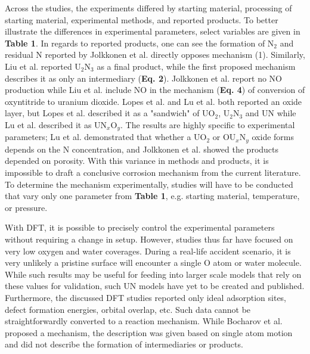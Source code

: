 \documentclass[11pt]{article}
\begin{document}
\begin{multicols}{2}
\par Across the studies, the experiments differed by starting material, processing of starting material, experimental methods, and reported products. To better illustrate the differences in experimental parameters, select variables are given in \textbf{Table 1}. In regards to reported products, one can see the formation of N$_{2}$ and residual N reported by Jolkkonen et al. \cite{Jolkkonen2017} directly opposes mechanism (1). Similarly, Liu et al. \cite{Liu2013} reported U$_{2}$N$_{3}$ as a final product, while the first proposed mechanism describes it as only an intermediary (\textbf{Eq. 2}). Jolkkonen et al. report no NO production while Liu et al. include NO in the mechanism (\textbf{Eq. 4}) of conversion of oxyntitride to uranium dioxide. Lopes et al. and Lu et al. both reported an oxide layer, but Lopes et al. described it as a "sandwich" of UO$_{2}$, U$_{2}$N$_{3}$ and UN while Lu et al. described it as UN$_{x}$O$_{y}$.
 The results are highly specific to experimental parameters; Lu et al. demonstrated that whether a UO$_{2}$ or  OU$_{x}$N$_{y}$ oxide forms depends on the N concentration, and Jolkkonen et al. showed the products depended on porosity. With this variance in methods and products, it is impossible to draft a conclusive corrosion mechanism from the current literature. To determine the mechanism experimentally, studies will have to be conducted that vary only one parameter from \textbf{Table 1}, e.g. starting material, temperature, or pressure.

\par With DFT, it is possible to precisely control the experimental parameters without requiring a change in setup. However, studies thus far have focused on very low oxygen and water coverages. During a real-life accident scenario, it is very unlikely a pristine surface will encounter a single O atom or water molecule. While such results may be useful for feeding into larger scale models that rely on these values for validation, such UN models have yet to be created and published. Furthermore, the discussed DFT studies reported only ideal adsorption sites, defect formation energies, orbital overlap, etc. Such data cannot be straightforwardly converted to a reaction mechanism. While Bocharov et al. \cite{Bocharov2013} proposed a mechanism, the description was given based on single atom motion and did not describe the formation of intermediaries or products.


\end{multicols}
\end{document}
